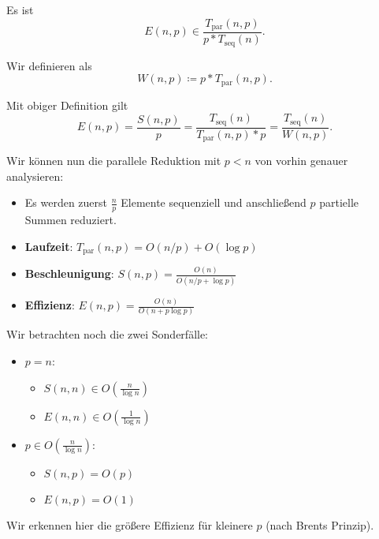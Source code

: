 Es ist
\begin{equation*}
  E(n,p) \in \frac{T_\text{par}(n,p)}{p*T_\text{seq}(n)}\text{.}
\end{equation*}

\begin{definition}[Arbeit]
  Wir definieren  als
  \begin{equation*}
    W(n,p) \coloneqq p*T_\text{par}(n,p) \text{.}
  \end{equation*}
\end{definition}

Mit obiger Definition gilt
\begin{equation*}
  E(n,p) = \frac{S(n,p)}{p} = \frac{T_\text{seq}(n)}{T_\text{par}(n,p)*p} = \frac{T_\text{seq}(n)}{W(n,p)}\text{.}
\end{equation*}

Wir können nun die parallele Reduktion mit \( p < n \) von vorhin genauer analysieren:
\begin{itemize}
  \item Es werden zuerst \( \tfrac{n}{p} \) Elemente sequenziell und anschließend \( p \) partielle Summen reduziert.
  \item \textbf{Laufzeit}: \( T_\text{par}(n,p) = O(n/p) + O(\log p) \)
  \item \textbf{Beschleunigung}: \( S(n,p) = \frac{O(n)}{O(n/p + \log p)} \)
  \item \textbf{Effizienz}: \( E(n,p) = \frac{O(n)}{O(n+p\log p)} \)
\end{itemize}

Wir betrachten noch die zwei Sonderfälle:
\begin{itemize}
  \item \( p = n \):
  \begin{itemize}
    \item \( S(n,n) \in O\left( \frac{n}{\log n} \right) \)
    \item \( E(n,n) \in O\left( \frac{1}{\log n} \right) \)
  \end{itemize}
  \item \( p \in O\left( \frac{n}{\log n} \right) \):
  \begin{itemize}
    \item \( S(n,p) = O(p) \)
    \item \( E(n,p) = O(1) \)
  \end{itemize}
\end{itemize}

Wir erkennen hier die größere Effizienz für kleinere \( p \) (nach Brents Prinzip).

